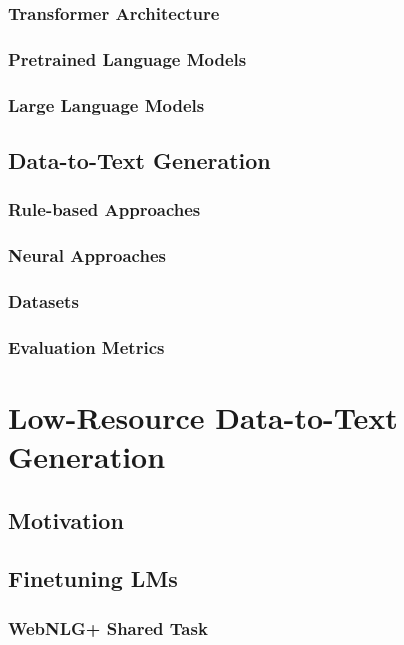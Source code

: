 \documentclass[12pt,notitlepage,a4paper,openright]{report}
\begin{document}
\subsection{Transformer Architecture}
\label{sec:transformer}
\subsection{Pretrained Language Models}
\label{sec:plms}
\subsection{Large Language Models}
\label{sec:llms}
\section{Data-to-Text Generation}
\label{sec:d2t}
\subsection{Rule-based Approaches}
\label{sec:rule-d2t}
\subsection{Neural Approaches}
\label{sec:neural-d2t}
\subsection{Datasets}
\label{sec:datasets}
\subsection{Evaluation Metrics}
\label{sec:evaluation}

\chapter{Low-Resource Data-to-Text Generation}
\label{chap:low-res}
\section{Motivation}
\label{sec:low-res-mot}
\section{Finetuning LMs}
\label{sec:finetuning}
\subsection{WebNLG+ Shared Task}
\label{sec:webnlgp}
\end{document}
